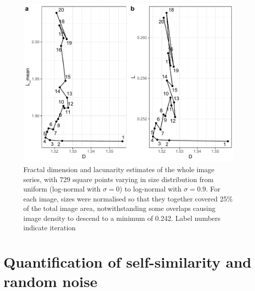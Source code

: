 \documentclass[
  12pt,
]{book}
\begin{document}
\begin{figure}

{\centering \includegraphics[width=0.9\linewidth]{bookdown-demo_files/figure-latex/08-distr-1} 

}

\caption{Fractal dimension and lacunarity estimates of the whole image series, with 729 square points varying in size distribution from uniform (log-normal with \(\sigma = 0\)) to log-normal with \(\sigma = 0.9\). For each image, sizes were normalised so that they together covered 25\% of the total image area, notwithstanding some overlaps causing image density to descend to a minimum of 0.242. Label numbers indicate iteration}\label{fig:08-distr}
\end{figure}

\FloatBarrier

\hypertarget{quantification-of-self-similarity-and-random-noise}{%
\section{Quantification of self-similarity and random noise}\label{quantification-of-self-similarity-and-random-noise}}
\end{document}
